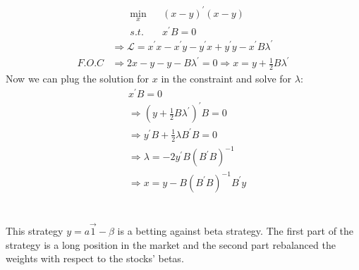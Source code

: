 \documentclass[hidelinks,12pt]{article}
\begin{document}
\section{}
\begin{equation*}
    \begin{aligned}
        & \underset{x }{\min}
        & & (x-y)^{'} (x-y) \\
        & s.t. 
        & & x^{'} B = 0 
    \end{aligned}
\end{equation*}
\begin{equation*}
    \begin{aligned}
    &\Rightarrow \mathcal{L} = x^{'} x - x^{'} y - y^{'} x + y^{'} y - x^{'} B \lambda^{'}\\
    F.O.C& \Rightarrow 2x - y - y - B \lambda^{'} = 0 \Rightarrow x = y + \frac{1}{2} B \lambda^{'} 
\end{aligned}
\end{equation*}
Now we can plug the solution for $x$ in the constraint and solve for $\lambda$:
\begin{equation*}
    \begin{aligned}
        & x^{'} B = 0 \\
        & \Rightarrow (y + \frac{1}{2} B \lambda^{'})^{'} B = 0 \\
        & \Rightarrow y^{'} B + \frac{1}{2} \lambda B^{'} B = 0 \\
        & \Rightarrow \lambda = -2 y^{'} B (B^{'} B)^{-1} \\
        & \Rightarrow x = y - B (B^{'} B)^{-1} B^{'} y
    \end{aligned}
\end{equation*}
\section{}
\subsection{}
This strategy $y = a \overrightarrow{1}  - \beta $ is a betting against beta strategy. The first part of the strategy is a long position in the market and the second part rebalanced the weights with respect to the stocks' betas.
\end{document}
